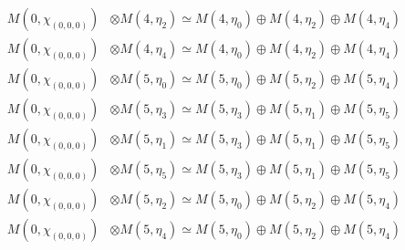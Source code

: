 \begin{align*}
M(0,\chi_{(0,0,0)}) &\otimes M(4,\eta_{2}) \simeq M(4,\eta_{0}) \oplus M(4,\eta_{2}) \oplus M(4,\eta_{4})\\
M(0,\chi_{(0,0,0)}) &\otimes M(4,\eta_{4}) \simeq M(4,\eta_{0}) \oplus M(4,\eta_{2}) \oplus M(4,\eta_{4})\\
M(0,\chi_{(0,0,0)}) &\otimes M(5,\eta_{0}) \simeq M(5,\eta_{0}) \oplus M(5,\eta_{2}) \oplus M(5,\eta_{4})\\
M(0,\chi_{(0,0,0)}) &\otimes M(5,\eta_{3}) \simeq M(5,\eta_{3}) \oplus M(5,\eta_{1}) \oplus M(5,\eta_{5})\\
M(0,\chi_{(0,0,0)}) &\otimes M(5,\eta_{1}) \simeq M(5,\eta_{3}) \oplus M(5,\eta_{1}) \oplus M(5,\eta_{5})\\
M(0,\chi_{(0,0,0)}) &\otimes M(5,\eta_{5}) \simeq M(5,\eta_{3}) \oplus M(5,\eta_{1}) \oplus M(5,\eta_{5})\\
M(0,\chi_{(0,0,0)}) &\otimes M(5,\eta_{2}) \simeq M(5,\eta_{0}) \oplus M(5,\eta_{2}) \oplus M(5,\eta_{4})\\
M(0,\chi_{(0,0,0)}) &\otimes M(5,\eta_{4}) \simeq M(5,\eta_{0}) \oplus M(5,\eta_{2}) \oplus M(5,\eta_{4})\\
\end{align*}


